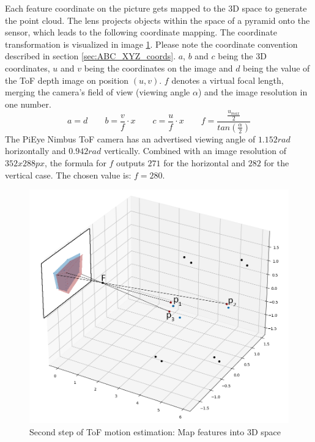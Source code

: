 Each feature coordinate on the picture gets mapped to the 3D space to generate the point cloud. The lens projects objects within the space of a pyramid onto the sensor, which leads to the following coordinate mapping. The coordinate transformation is visualized in image \ref{im:SiftCoordTransform}. Please note the coordinate convention described in section \ref{sec:ABC_XYZ_coords}. $a$, $b$ and $c$ being the 3D coordinates, $u$ and $v$ being the coordinates on the image and $d$ being the value of the ToF depth image on position $(u,v)$. $f$ denotes a virtual focal length, merging the camera's field of view (viewing angle $\alpha$) and the image resolution in one number.
\begin{equation*}
    a = d \qquad b = \frac{v}{f}\cdot x \qquad c = \frac{u}{f}\cdot x \qquad f=\frac{\tfrac{u_{max}}{2}}{tan(\tfrac{\alpha}{2})}
\end{equation*}
The PiEye Nimbus ToF camera has an advertised viewing angle of $1.152rad$ horizontally and $0.942rad$ vertically. Combined with an image resolution of $352 x 288px$, the formula for $f$ outputs $271$ for the horizontal and $282$ for the vertical case. The chosen value is: $f = 280$.
\begin{figure}[H]
    \centering
    \includegraphics[width=1.0\textwidth]{images/2d_to_3d.png}
    \caption{Second step of ToF motion estimation: Map features into 3D space}
    \label{im:SiftCoordTransform}
\end{figure}
